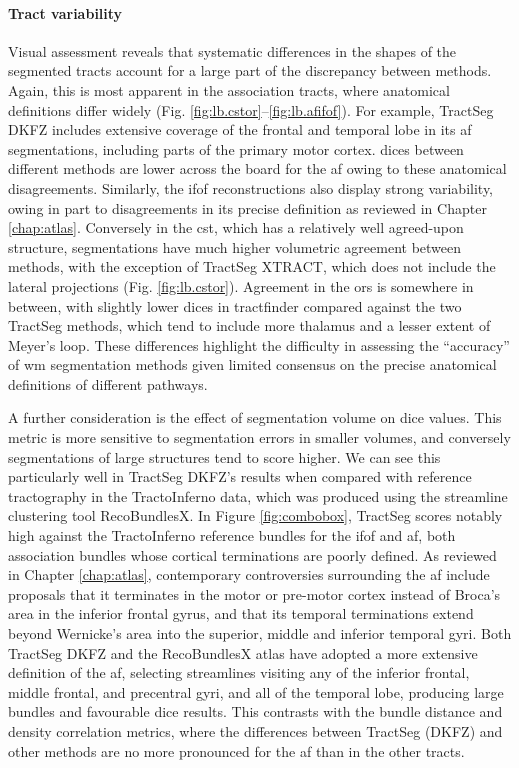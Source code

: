 \documentclass[12pt,phd,a4paper,twoside]{ucl_thesis}
\begin{document}
\paragraph*{Tract variability}

Visual assessment reveals that systematic differences in the shapes of the segmented tracts account for a large part of the discrepancy between methods.
Again, this is most apparent in the association tracts, where anatomical definitions differ widely (Fig. \ref{fig:lb.cstor}--\ref{fig:lb.afifof}).
For example, TractSeg DKFZ includes extensive coverage of the frontal and temporal lobe in its \gls{af} segmentations, including parts of the primary motor cortex.
\Glspl{dice} between different methods are lower across the board for the \gls{af} owing to these anatomical disagreements.
Similarly, the \gls{ifof} reconstructions also display strong variability, owing in part to disagreements in its precise definition as reviewed in Chapter \ref{chap:atlas}.
Conversely in the \gls{cst}, which has a relatively well agreed-upon structure, segmentations have much higher volumetric agreement between methods, with the exception of TractSeg XTRACT, which does not include the lateral projections (Fig. \ref{fig:lb.cstor}).
Agreement in the \glspl{or} is somewhere in between, with slightly lower \glspl{dice} in tractfinder compared against the two TractSeg methods, which tend to include more thalamus and a lesser extent of Meyer's loop.
These differences highlight the difficulty in assessing the ``accuracy'' of \gls{wm} segmentation methods given limited consensus on the precise anatomical definitions of different pathways.

A further consideration is the effect of segmentation volume on \gls{dice} values.
This metric is more sensitive to segmentation errors in smaller volumes, and conversely segmentations of large structures tend to score higher.
We can see this particularly well in TractSeg DKFZ's results when compared with reference tractography in the TractoInferno data, which was produced using the streamline clustering tool RecoBundlesX\autocite{Garyfallidis2018,Rheault2020a}.
In Figure \ref{fig:combobox}, TractSeg scores notably high against the TractoInferno reference bundles for the \gls{ifof} and \gls{af}, both association bundles whose cortical terminations are poorly defined.
As reviewed in Chapter \ref{chap:atlas}, contemporary controversies surrounding the \gls{af} include proposals that it terminates in the motor or pre-motor cortex instead of Broca's area in the inferior frontal gyrus, and that its temporal terminations extend beyond Wernicke's area into the superior, middle and inferior temporal gyri\autocite{Dick2012,Giampiccolo2022a}.
Both TractSeg DKFZ\autocite{Wasserthal2018c} and the RecoBundlesX atlas\autocite{Rheault2021} have adopted a more extensive definition of the \gls{af}, selecting streamlines visiting any of the inferior frontal, middle frontal, and precentral gyri, and all of the temporal lobe, producing large bundles and favourable \gls{dice} results.
This contrasts with the bundle distance and density correlation metrics, where the differences between TractSeg (DKFZ) and other methods are no more pronounced for the \gls{af} than in the other tracts.
\end{document}
